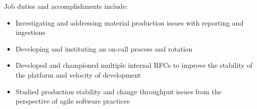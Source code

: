 \normalsize
Job duties and accomplishments include:
\small
\begin{itemize}
    \item Investigating and addressing material production issues with reporting and ingestions
    \item Developing and instituting an on-call process and rotation
    \item Developed and championed multiple internal RFCs to improve the stability of the platform and velocity of development
    \item Studied production stability and change throughput issues from the perspective of agile software practices
\end{itemize}
\normalsize
\medskip
